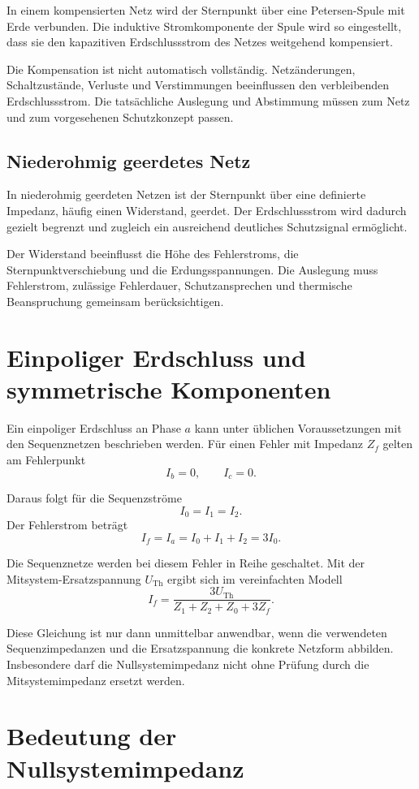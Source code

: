 In einem kompensierten Netz wird der Sternpunkt über eine
Petersen-Spule mit Erde verbunden. Die induktive Stromkomponente der Spule
wird so eingestellt, dass sie den kapazitiven Erdschlussstrom des Netzes
weitgehend kompensiert.

Die Kompensation ist nicht automatisch vollständig. Netzänderungen,
Schaltzustände, Verluste und Verstimmungen beeinflussen den verbleibenden
Erdschlussstrom. Die tatsächliche Auslegung und Abstimmung müssen zum
Netz und zum vorgesehenen Schutzkonzept passen.

\subsection{Niederohmig geerdetes Netz}

In niederohmig geerdeten Netzen ist der Sternpunkt über eine definierte
Impedanz, häufig einen Widerstand, geerdet. Der Erdschlussstrom wird
dadurch gezielt begrenzt und zugleich ein ausreichend deutliches
Schutzsignal ermöglicht.

Der Widerstand beeinflusst die Höhe des Fehlerstroms, die
Sternpunktverschiebung und die Erdungsspannungen. Die Auslegung muss
Fehlerstrom, zulässige Fehlerdauer, Schutzansprechen und thermische
Beanspruchung gemeinsam berücksichtigen.

\section{Einpoliger Erdschluss und symmetrische Komponenten}

Ein einpoliger Erdschluss an Phase \(a\) kann unter üblichen Voraussetzungen
mit den Sequenznetzen beschrieben werden. Für einen Fehler mit Impedanz
\(Z_f\) gelten am Fehlerpunkt
\[
  I_b=0,\qquad I_c=0.
\]

Daraus folgt für die Sequenzströme
\[
  I_0=I_1=I_2.
\]
Der Fehlerstrom beträgt
\[
  I_f=I_a=I_0+I_1+I_2=3I_0.
\]

Die Sequenznetze werden bei diesem Fehler in Reihe geschaltet. Mit der
Mitsystem-Ersatzspannung \(U_{\mathrm{Th}}\) ergibt sich im vereinfachten
Modell
\[
  I_f=
  \frac{3U_{\mathrm{Th}}}
  {Z_1+Z_2+Z_0+3Z_f}.
\]

Diese Gleichung ist nur dann unmittelbar anwendbar, wenn die verwendeten
Sequenzimpedanzen und die Ersatzspannung die konkrete Netzform abbilden.
Insbesondere darf die Nullsystemimpedanz nicht ohne Prüfung durch die
Mitsystemimpedanz ersetzt werden.

\section{Bedeutung der Nullsystemimpedanz}

